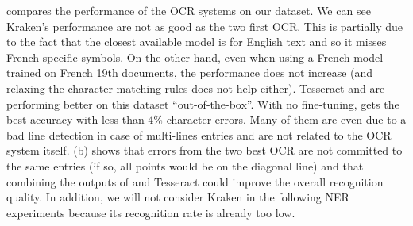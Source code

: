 %
 compares the performance of the OCR systems on our dataset. We can see Kraken's performance are
not as good as the two first OCR. This is partially due to the fact that the closest available model is for English text
and so it misses French specific symbols. On the other hand, even when using a French model trained on French 19th
documents, the performance does not increase (and relaxing the character matching rules does not help either). Tesseract and
\peroocr are performing better on this dataset ``out-of-the-box''. With no fine-tuning, \peroocr gets the best accuracy
with less than 4\% character errors. Many of them are even due to a bad line detection in case of multi-lines entries
and are not related to the OCR system itself.  (b) shows that errors from the two best OCR are not
committed to the same entries (if so, all points would be on the diagonal line) and that combining the outputs of
\peroocr and Tesseract could improve the overall recognition quality. 
In addition, we will not consider Kraken in the following NER experiments because its recognition rate is already too low.

